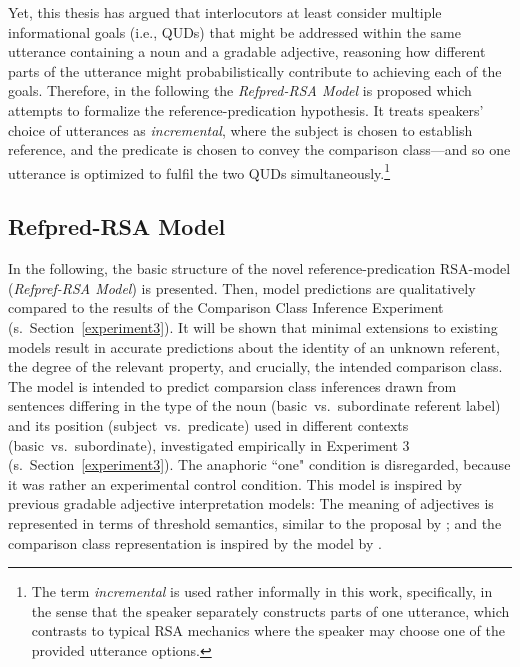 Yet, this thesis has argued that interlocutors at least consider multiple informational goals (i.e., QUDs) that might be addressed within the same utterance containing a noun and a gradable adjective, reasoning how different parts of the utterance might probabilistically contribute to achieving each of the goals. Therefore, in the following the \emph{Refpred-RSA Model} is proposed which attempts to formalize the reference-predication hypothesis. It treats speakers' choice of utterances as \emph{incremental}, where the subject is chosen to establish reference, and the predicate is chosen to convey the comparison class---and so one utterance is optimized to fulfil the two QUDs simultaneously.\footnote{The term \emph{incremental} is used rather informally in this work, specifically, in the sense that the speaker separately constructs parts of one utterance, which contrasts to typical RSA mechanics where the speaker may choose one of the provided utterance options.} 

\subsection{Refpred-RSA Model}
\label{refpred-rsa}
In the following, the basic structure of the novel reference-predication RSA-model (\emph{Refpref-RSA Model}) is presented. %
Then, model predictions are qualitatively compared to the results of the Comparison Class Inference Experiment (s.~Section~\ref{experiment3}). It will be shown that minimal extensions to existing models result in accurate predictions about the identity of an unknown referent, the degree of the relevant property, and crucially, the intended comparison class. 
The model is intended to predict comparsion class inferences drawn from sentences differing in the type of the noun (basic~vs.~subordinate referent label) and its position (subject~vs.~predicate) used in different contexts (basic~vs.~subordinate), investigated empirically in Experiment 3 (s.~Section~\ref{experiment3}). The anaphoric ``one" condition is disregarded, because it was rather an experimental control condition. This model is inspired by previous gradable adjective interpretation models: The meaning of adjectives is represented in terms of threshold semantics, similar to the proposal by \textcite{lassiter2013context}; and the comparison class representation is inspired by the model by \textcite{tessler2017warm}.

